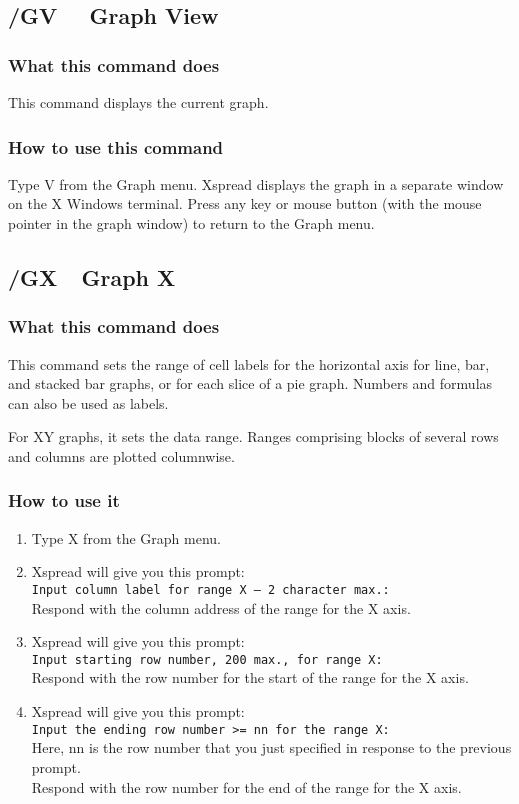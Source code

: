 \subsection*{/GV \ \     Graph View}

\subsubsection*{What this command does}
This command displays the current graph.

\subsubsection*{How to use this command}
Type V from the Graph menu.  Xspread displays the graph in a separate window on
the X Windows terminal.  Press any key or mouse button (with the mouse pointer
in the graph window) to return to the Graph menu.

\subsection*{/GX\ \      Graph X}

\subsubsection*{What this command does}
This command sets the range of cell labels for the horizontal axis for 
line, bar, and stacked bar graphs, or for each slice of a pie graph.  
Numbers and formulas can also be used as labels.

For XY graphs, it sets the data range.  Ranges comprising blocks of 
several rows and columns are plotted columnwise.

\subsubsection*{How to use it}
\begin{enumerate}
\item{Type X from the Graph menu.}
\item{Xspread will give you this prompt:\\
        {\tt Input column label for range X -- 2 character max.:} \\
        Respond with the column address of the range for the X axis.}
\item{Xspread will give you this prompt:\\
        {\tt Input starting row number, 200 max., for range X:} \\
        Respond with the row number for the start of the range for the X
        axis.}
\item{Xspread will give you this prompt:\\
        {\tt Input the ending row number >= nn for the range X:}\\
        Here, nn is the row number that you just specified in response to
        the previous prompt.\\
        Respond with the row number for the end of the range for the X
        axis.}
\end{enumerate}

